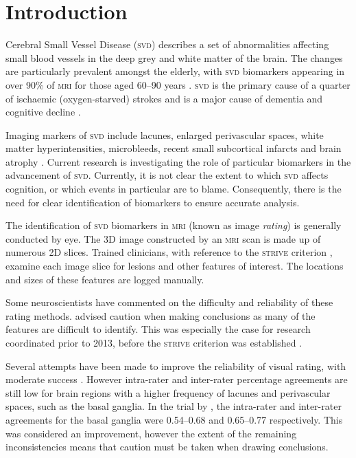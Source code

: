 %
%

\chapter{Introduction}\label{s-intro}

{\noindent} Cerebral Small Vessel Disease (\textsc{svd}) describes a set of abnormalities affecting small blood vessels in the deep grey and white matter of the brain. The changes are particularly prevalent amongst the elderly, with \textsc{svd} biomarkers appearing in over 90\% of \textsc{mri} for those aged 60--90 years \citep{deLeeuwF-E2001Pocw}. \textsc{svd} is the primary cause of a quarter of ischaemic (oxygen-starved) strokes \citep{WardlawJ.M.2013Nsfr} and is a major cause of dementia and cognitive decline \citep{NorrvingBo2008Linb}.

Imaging markers of \textsc{svd} include lacunes, enlarged perivascular spaces, white matter hyperintensities, microbleeds, recent small subcortical infarcts and brain atrophy \citep{WardlawJ.M.2013Nsfr}. Current research is investigating the role of particular biomarkers in the advancement of \textsc{svd}. Currently, it is not clear the extent to which \textsc{svd} affects cognition, or which events in particular are to blame. Consequently, there is the need for clear identification of biomarkers to ensure accurate analysis.

The identification of \textsc{svd} biomarkers in \textsc{mri} (known as image \textit{rating}) is generally conducted by eye. The 3D image constructed by an \textsc{mri} scan is made up of numerous 2D slices. Trained clinicians, with reference to the \textsc{strive} criterion \citep{WardlawJ.M.2013Nsfr}, examine each image slice for lesions and other features of interest. The locations and sizes of these features are logged manually.

Some neuroscientists have commented on the difficulty and reliability of these rating methods. \cite{WardlawJm2013Mosc} advised caution when making conclusions as many of the features are difficult to identify. This was especially the case for research coordinated prior to 2013, before the \textsc{strive} criterion was established \citep{WardlawJ.M.2013Nsfr}.

Several attempts have been made to improve the reliability of visual rating, with moderate success \citep{AdamsH.H.Hieab2013RMfD, PotterGillian2015CPSV}. However intra-rater and inter-rater percentage agreements are still low for brain regions with a higher frequency of lacunes and perivascular spaces, such as the basal ganglia. In the trial by \cite{PotterGillian2015CPSV},  the intra-rater and inter-rater agreements for the basal ganglia were 0.54--0.68 and 0.65--0.77 respectively. This was considered an improvement, however the extent of the remaining inconsistencies means that caution must be taken when drawing conclusions.

